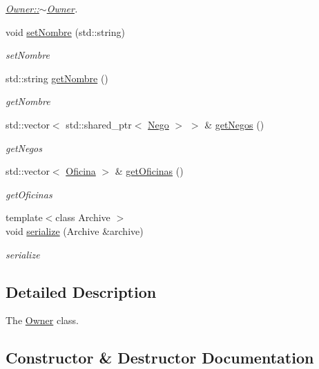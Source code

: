 \begin{DoxyCompactItemize}
\begin{DoxyCompactList}\small\item\em \hyperlink{classOwner_a1ab2bfec69ca4645de7f113f20e868c3}{Owner\+::$\sim$\+Owner}. \end{DoxyCompactList}\item 
void \hyperlink{classOwner_a6b7345e565bfcfde59b1871147765535}{set\+Nombre} (std\+::string)
\begin{DoxyCompactList}\small\item\em set\+Nombre \end{DoxyCompactList}\item 
std\+::string \hyperlink{classOwner_a13cd3eb4f058bfb2ea1d4ba05c61f5b8}{get\+Nombre} ()
\begin{DoxyCompactList}\small\item\em get\+Nombre \end{DoxyCompactList}\item 
std\+::vector$<$ std\+::shared\+\_\+ptr$<$ \hyperlink{classNego}{Nego} $>$ $>$ \& \hyperlink{classOwner_a30db4d5859801773a884c05c9a601d9a}{get\+Negos} ()
\begin{DoxyCompactList}\small\item\em get\+Negos \end{DoxyCompactList}\item 
std\+::vector$<$ \hyperlink{classOficina}{Oficina} $>$ \& \hyperlink{classOwner_a57ccce817249862c941aed8776f28364}{get\+Oficinas} ()
\begin{DoxyCompactList}\small\item\em get\+Oficinas \end{DoxyCompactList}\item 
{\footnotesize template$<$class Archive $>$ }\\void \hyperlink{classOwner_a411a7ce0f140930cec5c45b46319894c}{serialize} (Archive \&archive)
\begin{DoxyCompactList}\small\item\em serialize \end{DoxyCompactList}\end{DoxyCompactItemize}


\subsection{Detailed Description}
The \hyperlink{classOwner}{Owner} class. 

\subsection{Constructor \& Destructor Documentation}
\hypertarget{classOwner_ab9186e9839a04fe48baad103cc1d0ddb}{}
